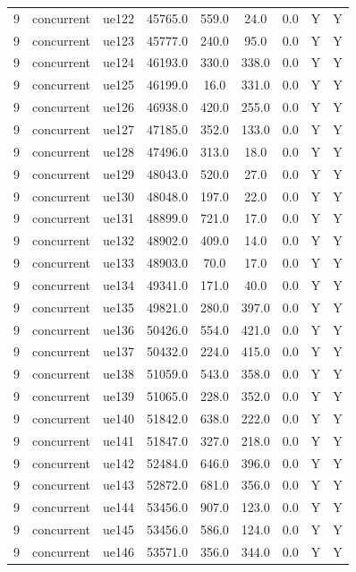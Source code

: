 \begin{table}[ht]
\begin{tabular}{|c|c|c|c|c|c|c|c|c|}
9 & concurrent & ue122 & 45765.0 & 559.0 & 24.0 & 0.0 & Y & Y \\
9 & concurrent & ue123 & 45777.0 & 240.0 & 95.0 & 0.0 & Y & Y \\
9 & concurrent & ue124 & 46193.0 & 330.0 & 338.0 & 0.0 & Y & Y \\
9 & concurrent & ue125 & 46199.0 & 16.0 & 331.0 & 0.0 & Y & Y \\
9 & concurrent & ue126 & 46938.0 & 420.0 & 255.0 & 0.0 & Y & Y \\
9 & concurrent & ue127 & 47185.0 & 352.0 & 133.0 & 0.0 & Y & Y \\
9 & concurrent & ue128 & 47496.0 & 313.0 & 18.0 & 0.0 & Y & Y \\
9 & concurrent & ue129 & 48043.0 & 520.0 & 27.0 & 0.0 & Y & Y \\
9 & concurrent & ue130 & 48048.0 & 197.0 & 22.0 & 0.0 & Y & Y \\
9 & concurrent & ue131 & 48899.0 & 721.0 & 17.0 & 0.0 & Y & Y \\
9 & concurrent & ue132 & 48902.0 & 409.0 & 14.0 & 0.0 & Y & Y \\
9 & concurrent & ue133 & 48903.0 & 70.0 & 17.0 & 0.0 & Y & Y \\
9 & concurrent & ue134 & 49341.0 & 171.0 & 40.0 & 0.0 & Y & Y \\
9 & concurrent & ue135 & 49821.0 & 280.0 & 397.0 & 0.0 & Y & Y \\
9 & concurrent & ue136 & 50426.0 & 554.0 & 421.0 & 0.0 & Y & Y \\
9 & concurrent & ue137 & 50432.0 & 224.0 & 415.0 & 0.0 & Y & Y \\
9 & concurrent & ue138 & 51059.0 & 543.0 & 358.0 & 0.0 & Y & Y \\
9 & concurrent & ue139 & 51065.0 & 228.0 & 352.0 & 0.0 & Y & Y \\
9 & concurrent & ue140 & 51842.0 & 638.0 & 222.0 & 0.0 & Y & Y \\
9 & concurrent & ue141 & 51847.0 & 327.0 & 218.0 & 0.0 & Y & Y \\
9 & concurrent & ue142 & 52484.0 & 646.0 & 396.0 & 0.0 & Y & Y \\
9 & concurrent & ue143 & 52872.0 & 681.0 & 356.0 & 0.0 & Y & Y \\
9 & concurrent & ue144 & 53456.0 & 907.0 & 123.0 & 0.0 & Y & Y \\
9 & concurrent & ue145 & 53456.0 & 586.0 & 124.0 & 0.0 & Y & Y \\
9 & concurrent & ue146 & 53571.0 & 356.0 & 344.0 & 0.0 & Y & Y \\

\end{tabular}
\end{table}

